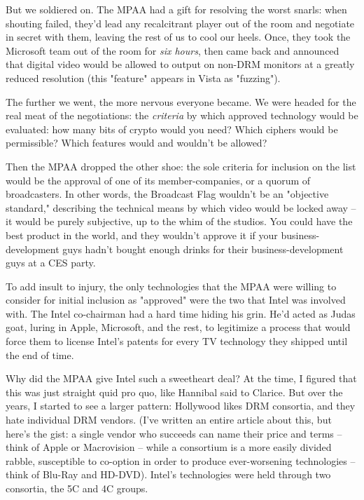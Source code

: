 But we soldiered on. The MPAA had a gift for resolving the worst
snarls: when shouting failed, they'd lead any recalcitrant player
out of the room and negotiate in secret with them, leaving the rest
of us to cool our heels. Once, they took the Microsoft team out of
the room for \emph{six hours}, then came back and announced that
digital video would be allowed to output on non-DRM monitors at a
greatly reduced resolution (this "feature" appears in Vista as
"fuzzing").

The further we went, the more nervous everyone became. We were
headed for the real meat of the negotiations: the \emph{criteria}
by which approved technology would be evaluated: how many bits of
crypto would you need? Which ciphers would be permissible? Which
features would and wouldn't be allowed?

Then the MPAA dropped the other shoe: the sole criteria for
inclusion on the list would be the approval of one of its
member-companies, or a quorum of broadcasters. In other words, the
Broadcast Flag wouldn't be an "objective standard," describing the
technical means by which video would be locked away -- it would be
purely subjective, up to the whim of the studios. You could have
the best product in the world, and they wouldn't approve it if your
business-development guys hadn't bought enough drinks for their
business-development guys at a CES party.

To add insult to injury, the only technologies that the MPAA were
willing to consider for initial inclusion as "approved" were the
two that Intel was involved with. The Intel co-chairman had a hard
time hiding his grin. He'd acted as Judas goat, luring in Apple,
Microsoft, and the rest, to legitimize a process that would force
them to license Intel's patents for every TV technology they
shipped until the end of time.

Why did the MPAA give Intel such a sweetheart deal? At the time, I
figured that this was just straight quid pro quo, like Hannibal
said to Clarice. But over the years, I started to see a larger
pattern: Hollywood likes DRM consortia, and they hate individual
DRM vendors. (I've written an entire article about this, but here's
the gist: a single vendor who succeeds can name their price and
terms -- think of Apple or Macrovision -- while a consortium is a
more easily divided rabble, susceptible to co-option in order to
produce ever-worsening technologies -- think of Blu-Ray and
HD-DVD). Intel's technologies were held through two consortia, the
5C and 4C groups.

